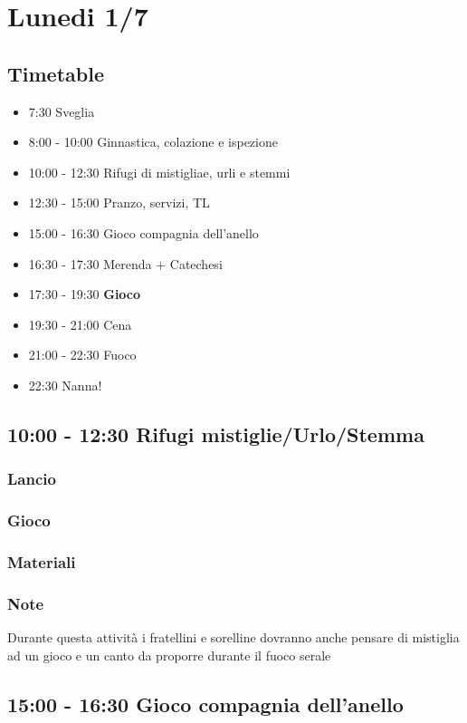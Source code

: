\documentclass[../main.tex]{subfiles}
\begin{document}
   \section{Lunedi 1/7}
   \subsection{Timetable}
   \begin{itemize}
        \item 7:30 Sveglia
        \item 8:00 - 10:00 Ginnastica, colazione e ispezione
        \item 10:00 - 12:30 Rifugi di mistigliae, urli e stemmi
        \item 12:30 - 15:00 Pranzo, servizi, TL
        \item 15:00 - 16:30 Gioco compagnia dell'anello
        \item 16:30 - 17:30 Merenda + Catechesi
        \item 17:30 - 19:30 \textbf{Gioco}
        \item 19:30 - 21:00 Cena
        \item 21:00 - 22:30 Fuoco
        \item 22:30 Nanna!
    \end{itemize}

   \subsection{10:00 - 12:30 Rifugi mistiglie/Urlo/Stemma}
       \subsubsection{Lancio}
        \subsubsection{Gioco}
        \subsubsection{Materiali}
        \subsubsection{Note}
        Durante questa attività i fratellini e sorelline dovranno anche pensare di mistiglia ad un gioco e un canto da proporre durante il fuoco serale
        
    \subsection{15:00 - 16:30 Gioco compagnia dell'anello}
\end{document}

